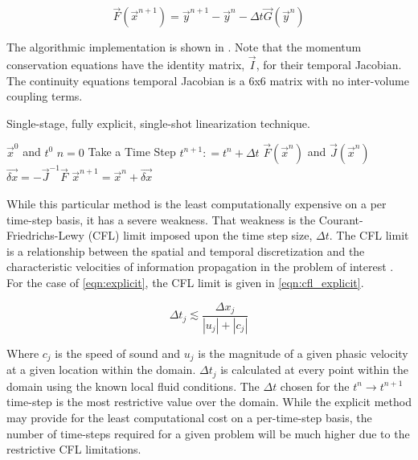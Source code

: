 \begin{equation}
\label{eqn:explicit}
\vec{F}(\vec{x}^{n+1}) = \vec{y}^{n+1} - \vec{y}^{n} - \Delta t \vec{G}(\vec{y}^{n})
\end{equation}

The algorithmic implementation is shown in .
Note that the momentum conservation equations have the identity matrix, $\vec{I}$, for their temporal Jacobian.
The continuity equations temporal Jacobian is a 6x6 matrix with no inter-volume coupling terms.

\begin{algo}[H]
\caption{Single-stage, fully explicit, single-shot linearization technique.}
\label{algo:explicit}
\setlength{\baselineskip}{0.625\baselineskip}
\begin{algorithmic}[1]
\Require $\vec{x}^{0}$ and $t^{0}$
\Set $n = 0$
\Loop \; Take a Time Step
    \State $t^{n+1} : = t^{n} + \Delta t$
    \Calculate $\vec{F}(\vec{x}^n)$ and $\vec{J}(\vec{x}^n)$
    \Calculate $\vec{\delta x} = -\vec{J}^{-1}\vec{F}$
    \Calculate $\vec{x}^{n+1} = \vec{x}^{n} + \vec{\delta x}$ 
\end{algorithmic}
\end{algo}

While this particular method is the least computationally expensive on a per time-step basis, it has a severe weakness.
That weakness is the Courant-Friedrichs-Lewy (CFL) limit imposed upon the time step size, $\Delta t$.
The CFL limit is a relationship between the spatial and temporal discretization and the characteristic velocities of information propagation in the problem of interest \cite{LeVeque2007, Tannehill1997}.
For the case of \eqref{eqn:explicit}, the CFL limit is given in \eqref{eqn:cfl_explicit}.

\begin{equation}
\label{eqn:cfl_explicit}
\Delta t_j \lesssim \frac{\Delta x_j}{|u_j|+|c_j|}
\end{equation}

Where $c_j$ is the speed of sound and $u_j$ is the magnitude of a given phasic velocity at a given location within the domain.
$\Delta t_j$ is calculated at every point within the domain using the known local fluid conditions.
The $\Delta t$ chosen for the $t^{n} \rightarrow t^{n+1}$ time-step is the most restrictive value over the domain.
While the explicit method may provide for the least computational cost on a per-time-step basis, the number of time-steps required for a given problem will be much higher due to the restrictive CFL limitations.

